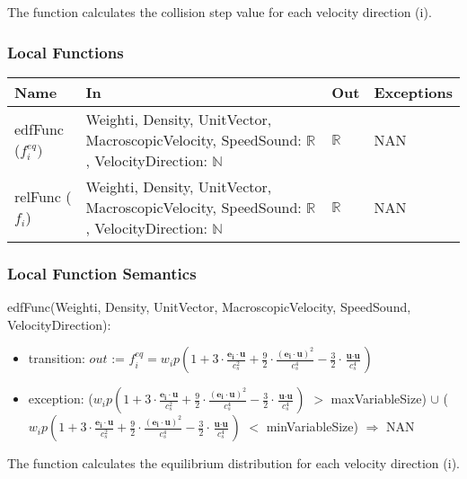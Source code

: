 \documentclass[12pt, titlepage]{article}
\begin{document}
The function calculates the collision step value for each velocity direction (i).

\subsubsection{Local Functions}

\begin{center}
	\begin{tabular}{p{2cm} p{3cm} p{4cm} p{2cm}}
		\hline
		\textbf{Name} & \textbf{In} & \textbf{Out} & \textbf{Exceptions} \\
		\hline
		edfFunc ($f_{i}^{eq})$ & Weighti, Density, UnitVector, MacroscopicVelocity, SpeedSound: $\mathbb{R}$, VelocityDirection: $\mathbb{N}$ & $\mathbb{R}$ & NAN \\
		relFunc ($f_{i}$) & Weighti, Density, UnitVector, MacroscopicVelocity, SpeedSound: $\mathbb{R}$, VelocityDirection: $\mathbb{N}$ & $\mathbb{R}$  & NAN \\
		\hline
	\end{tabular}
\end{center}

\subsubsection{Local Function Semantics}

\noindent edfFunc(Weighti, Density, UnitVector, MacroscopicVelocity, SpeedSound, VelocityDirection):
\begin{itemize}
	\item transition: $out$ := $f_{i}^{eq} = w_{i}p(1 + 3 \cdot \frac{\textbf{e}_\textbf{i}\cdot\textbf{u}}{c_s^2}+\frac{9}{2} \cdot \frac{(\textbf{e}_\textbf{i}\cdot\textbf{u})^2}{c_s^4}-\frac{3}{2} \cdot \frac{\textbf{u}\cdot\textbf{u}}{c_s^4})$
	\item exception: ($w_{i}p(1 + 3 \cdot \frac{\textbf{e}_\textbf{i}\cdot\textbf{u}}{c_s^2}+\frac{9}{2} \cdot \frac{(\textbf{e}_\textbf{i}\cdot\textbf{u})^2}{c_s^4}-\frac{3}{2} \cdot \frac{\textbf{u}\cdot\textbf{u}}{c_s^4})$ $>$ maxVariableSize) $\cup$ ($w_{i}p(1 + 3 \cdot \frac{\textbf{e}_\textbf{i}\cdot\textbf{u}}{c_s^2}+\frac{9}{2} \cdot \frac{(\textbf{e}_\textbf{i}\cdot\textbf{u})^2}{c_s^4}-\frac{3}{2} \cdot \frac{\textbf{u}\cdot\textbf{u}}{c_s^4})$ $<$ minVariableSize) $\Rightarrow$ NAN
\end{itemize}

The function calculates the equilibrium distribution for each velocity direction (i).\\
\end{document}

